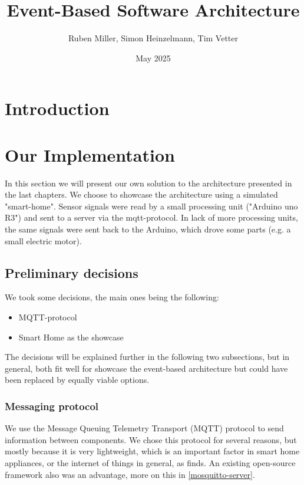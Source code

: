 \documentclass{article}
\title{Event-Based Software Architecture}
\author{Ruben Miller, Simon Heinzelmann, Tim Vetter}
\date{May 2025}
\begin{document}
\maketitle

\section{Introduction}

\section{Our Implementation}

In this section we will present our own solution to the architecture presented in the last chapters. We choose to showcase the architecture using a simulated "smart-home". Sensor signals were read by a small processing unit ("Arduino uno R3") and sent to a server via the mqtt-protocol. 
In lack of more processing units, the same signals were sent back to the Arduino, which drove some parts (e.g. a small electric motor).

\subsection{Preliminary decisions}
\label{preliminary-decisions}

We took some decisions, the main ones being the following:

\begin{itemize}
    \item MQTT-protocol
    \item Smart Home as the showcase
\end{itemize}

The decisions will be explained further in the following two subsections, but in general, both fit well for showcase the event-based architecture but could have been replaced by equally viable options.

\subsubsection{Messaging protocol}

We use the Message Queuing Telemetry Transport (MQTT) protocol to send information between components. We chose this protocol for several reasons, but mostly because it is very lightweight, which is an important factor in smart home appliances, or the internet of things in general, as \textcite{8893617} finds. An existing open-source framework also was an advantage, more on this in \autoref{mosquitto-server}.
\end{document}
